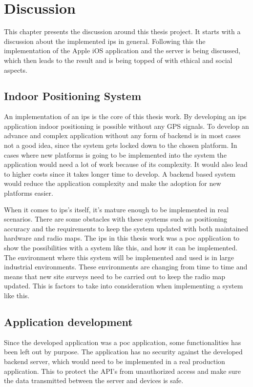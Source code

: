 \chapter{Discussion} \label{discussion}
This chapter presents the discussion around this thesis project.
It starts with a discussion about the implemented \acrfull{ips} in general.
Following this the implementation of the Apple iOS application and the server is being discussed, which then leads to the result and is being topped of with ethical and social aspects.


\section{Indoor Positioning System}\label{sec:discussionIps}
An implementation of an \acrshort{ips} is the core of this thesis work.
By developing an \acrshort{ips} application indoor positioning is possible without any GPS signals.
To develop an advance and complex application without any form of backend is in most cases not a good idea, since the system gets locked down to the chosen platform.
In cases where new platforms is going to be implemented into the system the application would need a lot of work because of its complexity.
It would also lead to  higher costs since it takes longer time to develop.
A backend based system would reduce the application complexity and make the adoption for new platforms easier.

\bigskip

When it comes to \acrshort{ips}'s itself, it's mature enough to be implemented in real scenarios.
There are some obstacles with these systems such as positioning accuracy and the requirements to keep the system updated with both maintained hardware and radio maps.
The \acrshort{ips} in this thesis work was a \acrfull{poc} application to show the possibilities with a system like this, and how it can be implemented.
The environment where this system will be implemented and used is in large industrial environments.
These environments are changing from time to time and means that new site surveys need to be carried out to keep the radio map updated.
This is factors to take into consideration when implementing a system like this.


\section{Application development}\label{sec:}
Since the developed application was a \acrshort{poc} application, some functionalities has been left out by purpose.
The application has no security against the developed backend server, which would need to be implemented in a real production application.
This to protect the API's from unauthorized access and make sure the data transmitted between the server and devices is safe.

